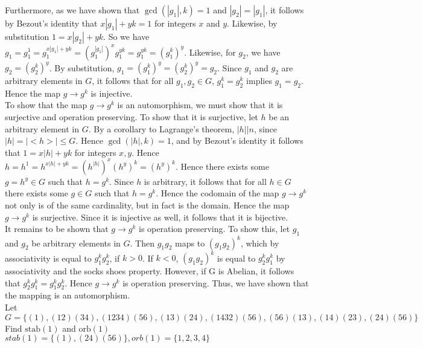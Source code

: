 \documentclass{article}
\newcommand{\stab}{\mbox{stab}}
\newcommand{\orb}{\mbox{orb}}
\begin{document}
Furthermore, as we have shown that $\gcd(|g_1|,k) = 1$ and $|g_2| = |g_1|$, it follows by Bezout's identity that $x|g_1| + yk = 1$ for integers $x$ and $y$. Likewise, by substitution $1 = x|g_2| + yk$. So we have $g_1 = g_1^1 = g_1^{x|g_1| + yk} = (g_1^{|g_1|})^xg_1^{yk} = g_1^{yk} = (g_1^k)^y$. Likewise, for $g_2$, we have $g_2 = (g_2^k)^y$. By substitution, $g_1 = (g_1^k)^y = (g_2^k)^y = g_2$. Since $g_1$ and $g_2$ are arbitrary elements in $G$, it follows that for all $g_1,g_2\in G$, $g_1^k = g_2^k$ implies $g_1 = g_2$. Hence the map $g\rightarrow g^k$ is injective.
\\

 To show that the map $g\rightarrow g^k$ is an automorphism, we must show that it is surjective and operation preserving. To show that it is surjective, let $h$ be an arbitrary element in $G$. By a corollary to Lagrange's theorem, $|h|\big | n$, since $|h| = |<h>|\le G$. Hence $\gcd(|h|,k) = 1$, and by Bezout's identity it follows that $1 = x|h| + yk$ for integers $x,y$. Hence $h = h^1 = h^{x|h| + yk} = (h^{|h|})^x(h^y)^k = (h^y)^k.$ Hence there exists some $g = h^y\in G$ such that $h = g^k$. Since $h$ is arbitrary, it follows that for all $h \in G$ there exists some $g\in G$ such that $h = g^k$. Hence the codomain of the map $g\rightarrow g^k$ not only is of the same cardinality, but in fact is the domain. Hence the map $g\rightarrow g^k$ is surjective. Since it is injective as well, it follows that it is bijective.\\

It remains to be shown that $g\rightarrow g^k$ is operation preserving. To show this, let $g_1$ and $g_2$ be arbitrary elements in $G$. Then $g_1g_2$ maps to $(g_1g_2)^k$, which by associativity is equal to $g_1^kg_2^k$, if $k>0$. If $k<0$, $(g_1g_2)^k$ is equal to $g_2^kg_1^k$ by associativity and the socks shoes property. However, if G is Abelian, it follows that $g_2^kg_1^k = g_1^kg_2^k$. Hence $g\rightarrow g^k$ is operation preserving. Thus, we have shown that the mapping is an automorphism. \\

 Let $G=\{(1), (12)(34), (1234)(56), (13)(24), (1432)(56), (56)(13), (14)(23), (24)(56)\}$\\

Find $\stab(1)$ and $\orb(1)$\\

$stab(1)=\{(1), (24)(56)\}, orb(1)=\{1, 2, 3, 4\}$\\
\end{document}
